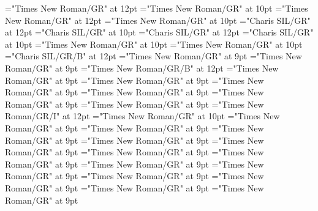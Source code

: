 \documentclass[gps1,twoside]{article}
\begin{document}
\pagestyle{plain}
\sloppy
\setlength{\parfillskip}{0pt plus 1fil}
\font\diven="Times New Roman/GR" at 12pt
\font\spanen="Times New Roman/GR" at 10pt
\font\divtpi="Times New Roman/GR" at 12pt
\font\spantpi="Times New Roman/GR" at 10pt
\font\divbzh="Charis SIL/GR" at 12pt
\font\spanbzh="Charis SIL/GR" at 10pt
\font\divbzhfonipa="Charis SIL/GR" at 12pt
\font\spanbzhfonipa="Charis SIL/GR" at 10pt
\font\spanfr="Times New Roman/GR" at 10pt
\font\spanes="Times New Roman/GR" at 10pt
\font\spanbzhmainheadwordentry="Charis SIL/GR/B" at 12pt
\font\spanspanmainheadwordentrybefore="Times New Roman/GR" at 9pt
\font\spanmainheadwordentrylastchildafter="Times New Roman/GR" at 9pt
\font\spanmainheadwordentry="Times New Roman/GR/B" at 12pt
\font\pronunciationpronunciationpronunciationsentrybefore="Times New Roman/GR" at 9pt
\font\pronunciationsentryafter="Times New Roman/GR" at 9pt
\font\spanspanformpronunciationpronunciationsentrybefore="Times New Roman/GR" at 9pt
\font\spanformpronunciationpronunciationsentryfirstchildbefore="Times New Roman/GR" at 9pt
\font\spanformpronunciationpronunciationsentrylastchildafter="Times New Roman/GR" at 9pt
\font\locationpronunciationpronunciationsentryafter="Times New Roman/GR" at 9pt
\font\locationpronunciationpronunciationsentry="Times New Roman/GR/I" at 12pt
\font\spanwritingsystemprefixspanabbreviationlocationpronunciationpronunciationsentry="Times New Roman/GR" at 10pt
\font\spanwritingsystemprefixspanabbreviationlocationpronunciationpronunciationsentryafter="Times New Roman/GR" at 9pt
\font\spanspanabbreviationlocationpronunciationpronunciationsentrybefore="Times New Roman/GR" at 9pt
\font\spanabbreviationlocationpronunciationpronunciationsentrylastchildafter="Times New Roman/GR" at 9pt
\font\spanspannamelocationpronunciationpronunciationsentrybefore="Times New Roman/GR" at 9pt
\font\spannamelocationpronunciationpronunciationsentrylastchildafter="Times New Roman/GR" at 9pt
\font\spanspanaliaslocationpronunciationpronunciationsentrybefore="Times New Roman/GR" at 9pt
\font\spanaliaslocationpronunciationpronunciationsentrylastchildafter="Times New Roman/GR" at 9pt
\font\spanspanvariantformentrybackrefsentrybefore="Times New Roman/GR" at 9pt
\font\variantformentrybackrefsentrybefore="Times New Roman/GR" at 9pt
\font\variantformentrybackrefsentryafter="Times New Roman/GR" at 9pt
\font\variantentrytypevariantentrytypevariantentrytypesvariantformentrybackrefvariantformentrybackrefsentrybefore="Times New Roman/GR" at 9pt
\font\variantentrytypesvariantformentrybackrefvariantformentrybackrefsentryafter="Times New Roman/GR" at 9pt
\font\spanspanreverseabbrvariantentrytypevariantentrytypesvariantformentrybackrefvariantformentrybackrefsentrybefore="Times New Roman/GR" at 9pt
\end{document}
